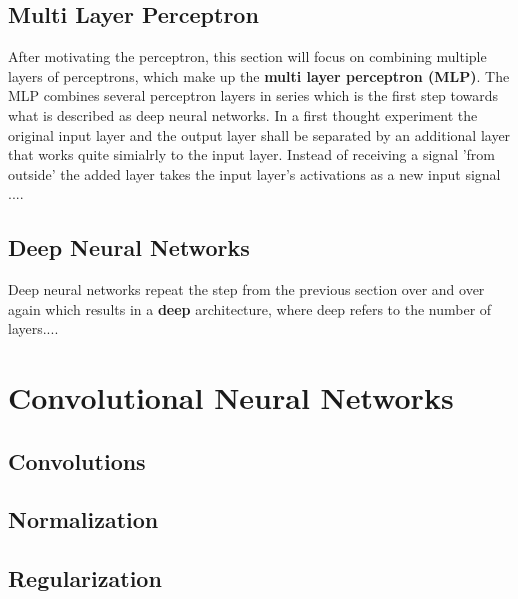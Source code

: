 \subsection{Multi Layer Perceptron}
After motivating the perceptron, this section will focus on combining multiple layers
of perceptrons, which make up the \textbf{multi layer perceptron (MLP)}.
The MLP combines several perceptron layers in series which is the first step towards
what is described as deep neural networks.
In a first thought experiment the original input layer and the output layer shall
be separated by an additional layer that works quite simialrly to the input layer.
Instead of receiving a signal 'from outside' the added layer takes the input layer's
activations as a new input signal ....


\subsection{Deep Neural Networks}
Deep neural networks repeat the step from the previous section over and over again
which results in a \textbf{deep} architecture, where deep refers to the number of
layers....


\section{Convolutional Neural Networks}
\subsection{Convolutions}

\subsection{Normalization}

\subsection{Regularization}

